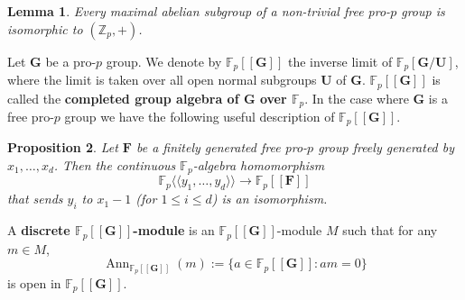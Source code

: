 \documentclass[11pt]{amsart}
\newtheorem{lem}{Lemma}[section]
\newtheorem{pro}[lem]{Proposition}
\numberwithin{claimcounter}{lem}
\DeclareMathOperator{\Ann}{Ann}
\newcommand{\Z}{\mathbb{Z}}
\newcommand{\F}{\mathbb{F}}
\begin{document}
\begin{lem} \label{naxab}
Every maximal abelian subgroup of a non-trivial free pro-$p$ group is isomorphic to $(\Z_p,+)$.
\end{lem}

Let $\mathbf G$ be a  pro-$p$ group. We denote by $\F_p[[\mathbf G]]$ the inverse limit of $\F_p[\mathbf G/\mathbf U]$, where the limit is
   taken over     all open normal subgroups $\mathbf U$ of $\mathbf G$.  $\F_p[[\mathbf G]]$ is called the {\bf   completed group algebra of $\mathbf G$ over $\F_p$}. In the case where $\mathbf G$ is a free pro-$p$ group we have the following useful description of  $\F_p[[\mathbf G]]$.
   \begin{pro}\cite[Section II, Proposition 3.1.4]{La65} \label{Lazard}
   Let $\mathbf F$ be a finitely generated free pro-$p$ group freely generated by $x_1,\ldots, x_d$. Then the continuous $\F_p$-algebra homomorphism
   $$\F_p\langle \!\langle y_1,\ldots, y_d\rangle \!\rangle \to \F_p[[\mathbf F]]$$ that sends $y_i$ to $ x_1-1$  (for $1\le i\le d$) is an isomorphism.
   \end{pro}
   
   A {\bf discrete $\F_p[[\mathbf G]]$-module} is an $\F_p[[\mathbf G]]$-module $M$ such that for any $m\in M$, $$\Ann_{\F_p[[\mathbf G]]}(m):=\{a\in \F_p[[\mathbf G]]\colon am=0\}$$ is open in $\F_p[[\mathbf G]]$. 
   
\end{document}
